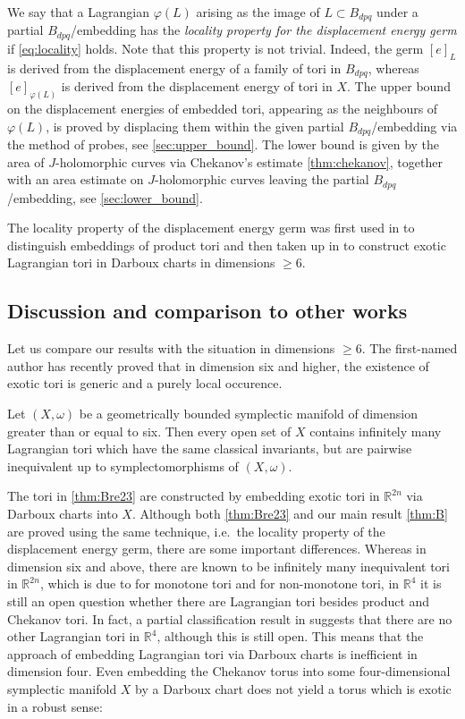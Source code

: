 \documentclass[AIF,Unicode,manuscript]{cedram}
\begin{document}
We say that a Lagrangian $\varphi(L)$ arising as the image of $L \subset B_{dpq}$ under a partial $B_{dpq}$\-/embedding has the \emph{locality property for the displacement energy germ} if \eqref{eq:locality} holds. Note that this property is not trivial.
Indeed, the germ $[e]_L$ is derived from the displacement energy of a family of tori in $B_{dpq}$, whereas $[e]_{\varphi(L)}$ is derived from the displacement energy of tori in $X$. The upper bound on the displacement energies of embedded tori, appearing as the neighbours of $\varphi(L)$, is proved by displacing them within the given partial $B_{dpq}$\-/embedding via the method of probes, see \cref{sec:upper_bound}. The lower bound is given by the area of $J$-holomorphic curves via Chekanov's estimate \cref{thm:chekanov}, together with an area estimate on $J$-holomorphic curves leaving the partial $B_{dpq}$\-/embedding, see \cref{sec:lower_bound}.

The locality property of the displacement energy germ was first used in \cite{chekanovschlenk2015} to distinguish embeddings of product tori and then taken up in \cite{brendel2023local} to construct exotic Lagrangian tori in Darboux charts in dimensions $\geqslant 6$.

\subsection{Discussion and comparison to other works}
\label{sec:intro_discussion}

Let us compare our results with the situation in dimensions $\geqslant 6$.
The first-named author has recently proved that in dimension six and higher, the existence of exotic tori is generic and a purely local occurence. 
\begin{theorem}\cite[Theorem D]{brendel2023local}
    \label{thm:Bre23}
    Let $(X,\omega)$ be a geometrically bounded symplectic manifold of dimension greater than or equal to six.
    Then every open set of $X$ contains infinitely many Lagrangian tori which have the same classical invariants, but are pairwise inequivalent up to symplectomorphisms of $(X,\omega)$.
\end{theorem}

The tori in \cref{thm:Bre23} are constructed by embedding exotic tori in $\mathbb{R}^{2n}$ via Darboux charts into $X$.
Although both \cref{thm:Bre23} and our main result \cref{thm:B} are proved using the same technique, i.e.\ the locality property of the displacement energy germ, there are some important differences.
Whereas in dimension six and above, there are known to be infinitely many inequivalent tori in $\mathbb{R}^{2n}$, which is due to \cite{Aur15} for monotone tori and \cite{brendel2023local} for non-monotone tori, in $\mathbb{R}^4$ it is still an open question whether there are Lagrangian tori besides product and Chekanov tori.
In fact, a partial classification result in \cite{Riz19} suggests that there are no other Lagrangian tori in $\mathbb{R}^4$, although this is still open.
This means that the approach of embedding Lagrangian tori via Darboux charts is inefficient in dimension four.
Even embedding the Chekanov torus into some four-dimensional symplectic manifold $X$ by a Darboux chart does not yield a torus which is exotic in a robust sense:
 
\end{document}
